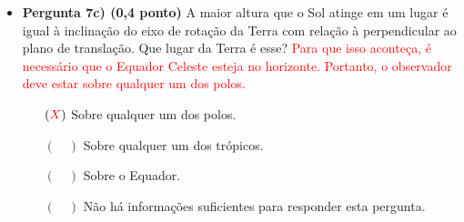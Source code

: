 \documentclass[a4paper, 12pt]{article}
\newcommand{\red}[1]{\textcolor{red}{#1}}
\begin{document}
\begin{flushleft}
\begin{itemize}
\begin{itemize}
\begin{itemize}
                        \end{itemize}
                    \item \textbf{Pergunta 7c) (0,4 ponto)} A maior altura que o Sol atinge em um lugar é igual à inclinação do eixo de rotação da Terra com relação à perpendicular ao plano de translação. Que lugar da Terra é esse?
                        \linebreak \red{Para que isso aconteça, é necessário que o Equador Celeste esteja no horizonte. Portanto, o observador deve estar sobre qualquer um dos polos.}
                        \begin{itemize}
                            \item[$(\red{X})$] Sobre qualquer um dos polos.
                            \item[$(\quad)$] Sobre qualquer um dos trópicos.
                            \item[$(\quad)$] Sobre o Equador.
                            \item[$(\quad)$] Não há informações suficientes para responder esta pergunta.
                        \end{itemize}
                \end{itemize}
        \end{itemize} \end{flushleft}
\end{document}

